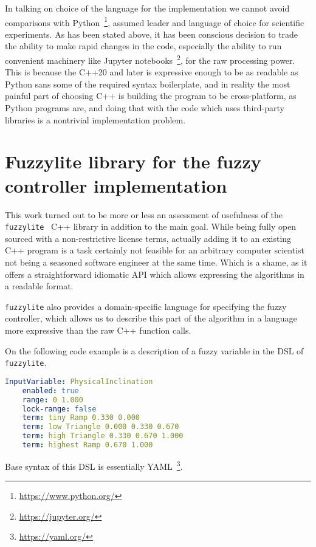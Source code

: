 \documentclass[12pt, a4paper]{report}
\begin{document}
	In talking on choice of the language for the implementation we cannot avoid comparisons with Python~\footnote{\url{https://www.python.org/}}, assumed leader and language of choice for scientific experiments.
	As has been stated above, it has been conscious decision to trade the ability to make rapid changes in the code, especially the ability to run convenient machinery like Jupyter notebooks~\footnote{\url{https://jupyter.org/}}, for the raw processing power.
	This is because the C++20 and later is expressive enough to be as readable as Python sans some of the required syntax boilerplate, and in reality the most painful part of choosing C++ is building the program to be cross-platform, as Python programs are, and doing that with the code which uses third-party libraries is a nontrivial implementation problem.

	\section{Fuzzylite library for the fuzzy controller implementation}\label{fuzzy-implementation}

	This work turned out to be more or less an assessment of usefulness of the \texttt{fuzzylite}~\cite{fl::fuzzylite} C++ library in addition to the main goal.
	While being fully open sourced with a non-restrictive license terms, actually adding it to an existing C++ program is a task certainly not feasible for an arbitrary computer scientist not being a seasoned software engineer at the same time.
	Which is a shame, as it offers a straightforward idiomatic API which allows expressing the algorithms in a readable format.

	\texttt{fuzzylite} also provides a domain-specific language for specifying the fuzzy controller, which allows us to describe this part of the algorithm in a language more expressive than the raw C++ function calls.

  On the following code example is a description of a fuzzy variable in the DSL of \texttt{fuzzylite}.

  \begin{lstlisting}[language=yaml]
  InputVariable: PhysicalInclination
    enabled: true
    range: 0 1.000
    lock-range: false
    term: tiny Ramp 0.330 0.000
    term: low Triangle 0.000 0.330 0.670
    term: high Triangle 0.330 0.670 1.000
    term: highest Ramp 0.670 1.000
  \end{lstlisting}

  Base syntax of this DSL is essentially YAML~\footnote{\url{https://yaml.org/}}.
\end{document}
